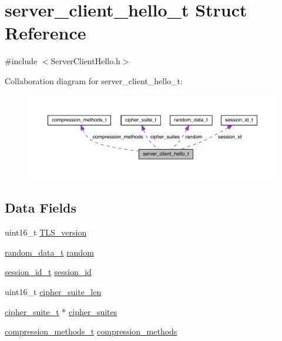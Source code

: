 \hypertarget{structserver__client__hello__t}{}\section{server\+\_\+client\+\_\+hello\+\_\+t Struct Reference}
\label{structserver__client__hello__t}


{\ttfamily \#include $<$Server\+Client\+Hello.\+h$>$}



Collaboration diagram for server\+\_\+client\+\_\+hello\+\_\+t\+:\nopagebreak
\begin{figure}[H]
\begin{center}
\leavevmode
\includegraphics[width=350pt]{structserver__client__hello__t__coll__graph}
\end{center}
\end{figure}
\subsection*{Data Fields}
\begin{DoxyCompactItemize}
\item 
uint16\+\_\+t \hyperlink{structserver__client__hello__t_a5b4305b976c657bb4a056e00aeadb8ef}{T\+L\+S\+\_\+version}
\item 
\hyperlink{structrandom__data__t}{random\+\_\+data\+\_\+t} \hyperlink{structserver__client__hello__t_aefaae3d96978baaa21b9445a5728b4fe}{random}
\item 
\hyperlink{structsession__id__t}{session\+\_\+id\+\_\+t} \hyperlink{structserver__client__hello__t_a74379b0c9faddd3c3481e648a4ba2356}{session\+\_\+id}
\item 
uint16\+\_\+t \hyperlink{structserver__client__hello__t_a706adb2fc3f8fa8fe9bdd5793f32183e}{cipher\+\_\+suite\+\_\+len}
\item 
\hyperlink{structcipher__suite__t}{cipher\+\_\+suite\+\_\+t} $\ast$ \hyperlink{structserver__client__hello__t_a545e2b09874bc2250aed603ef61820a6}{cipher\+\_\+suites}
\item 
\hyperlink{structcompression__methods__t}{compression\+\_\+methods\+\_\+t} \hyperlink{structserver__client__hello__t_a08a470f144044c5ea244590f9ead8165}{compression\+\_\+methods}
\end{DoxyCompactItemize}


